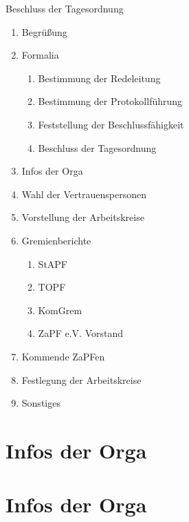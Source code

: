 \documentclass[compress, aspectratio=169]{beamer}
\begin{document}
	\begin{frame}{Beschluss der Tagesordnung}
		\begin{multicols}{2}
			\begin{enumerate}
				\item Begrüßung
				\item Formalia
				\begin{enumerate}
					\item Bestimmung der Redeleitung
					\item Bestimmung der Protokollführung
					\item Feststellung der Beschlussfähigkeit
					\item Beschluss der Tagesordnung
				\end{enumerate}
				\item Infos der Orga
				\item Wahl der Vertrauenspersonen
				\item Vorstellung der Arbeitskreise
				\item Gremienberichte
				\begin{enumerate}
					\item StAPF
					\item TOPF
					\item KomGrem
					\item ZaPF e.V. Vorstand
				\end{enumerate}
				\item Kommende ZaPFen
				\item Festlegung der Arbeitskreise
				\item Sonstiges
			\end{enumerate}
		\end{multicols}
	\end{frame}
	
	\section{Infos der Orga}
	

	
	\section{Infos der Orga}
	
\end{document}
